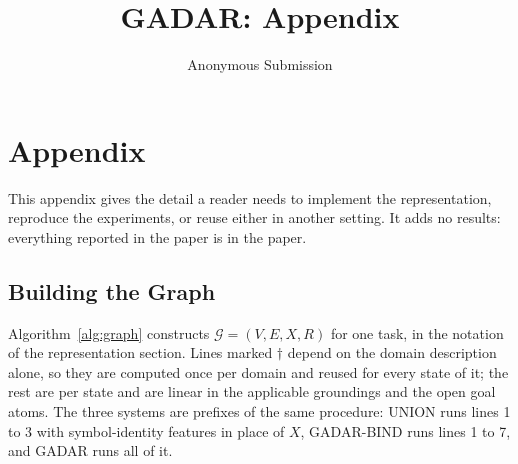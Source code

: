\documentclass[letterpaper]{article}
\title{GADAR: Appendix}
\author{Anonymous Submission}
\newcommand{\gadar}{GADAR}
\newcommand{\gadarbind}{\gadar{}-BIND}
\newcommand{\union}{UNION}
\begin{document}
\maketitle
\fi

\appendix
\section{Appendix}

This appendix gives the detail a reader needs to implement the
representation, reproduce the experiments, or reuse either in another
setting. It adds no results: everything reported in the paper is in the
paper.

\subsection{Building the Graph}
\label{app:pseudocode}

Algorithm~\ref{alg:graph} constructs $\mathcal{G} = (V, E, X, R)$ for one
task, in the notation of the representation section. Lines marked $\dagger$
depend on the domain description alone, so they are computed once per domain
and reused for every state of it; the rest are per state and are linear in
the applicable groundings and the open goal atoms. The three systems are
prefixes of the same procedure: \union{} runs lines 1 to 3 with
symbol-identity features in place of $X$, \gadarbind{} runs lines 1 to 7, and
\gadar{} runs all of it.
\end{document}
